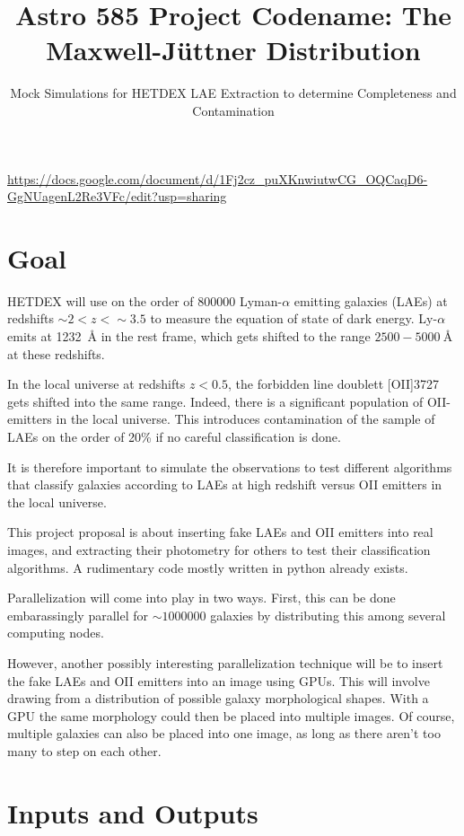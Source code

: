 \documentclass[11pt]{article}
\title{Astro 585 Project Codename: The Maxwell-Jüttner Distribution}
\author{Mock Simulations for HETDEX LAE Extraction to determine Completeness
and Contamination}
\begin{document}
\maketitle

\url{https://docs.google.com/document/d/1Fj2cz_puXKnwiutwCG_OQCaqD6-GgNUagenL2Re3VFc/edit?usp=sharing}


\section{Goal}

HETDEX will use on the order of $\num{800000}$ Lyman-$\alpha$
emitting galaxies (LAEs) at redshifts $\sim2<z<\sim3.5$ to measure the equation
of state of dark energy. Ly-$\alpha$ emits at \SI{1232}{\angstrom} in the rest
frame, which gets shifted to the range $\num{2500}-\SI{5000}{\angstrom}$ at
these redshifts.

In the local universe at redshifts $z<0.5$, the forbidden line doublett
[OII]3727 gets shifted into the same range. Indeed, there is a significant
population of OII-emitters in the local universe. This introduces contamination
of the sample of LAEs on the order of 20\% if no careful classification is
done.

It is therefore important to simulate the observations to test different
algorithms that classify galaxies according to LAEs at high redshift versus OII
emitters in the local universe.

This project proposal is about inserting fake LAEs and OII emitters into real
images, and extracting their photometry for others to test their classification
algorithms. A rudimentary code mostly written in python already exists.

Parallelization will come into play in two ways. First, this can be done
embarassingly parallel for $\sim\num{1000000}$ galaxies by distributing this
among several computing nodes.

However, another possibly interesting parallelization technique will be to
insert the fake LAEs and OII emitters into an image using GPUs. This will
involve drawing from a distribution of possible galaxy morphological shapes.
With a GPU the same morphology could then be placed into multiple images. Of
course, multiple galaxies can also be placed into one image, as long as there
aren't too many to step on each other.


\section{Inputs and Outputs}
\end{document}
